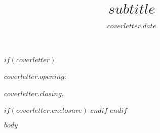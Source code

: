 \documentclass[letterpaper,10pt,final]{moderncv}
\title{$subtitle$}
\begin{document}
$if(coverletter)$
\date{$coverletter.date$}
\opening{$coverletter.opening$:}
\closing{$coverletter.closing$, \vspace{-0.5cm}}
$if(coverletter.enclosure)$
$endif$
$endif$

\makelettertitle

$body$

\makeletterclosing
\end{document}
